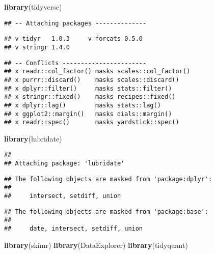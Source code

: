 \documentclass[
]{article}
\newenvironment{Shaded}{\begin{snugshade}}{\end{snugshade}}
\newcommand{\KeywordTok}[1]{\textcolor[rgb]{0.13,0.29,0.53}{\textbf{#1}}}
\newcommand{\NormalTok}[1]{#1}
\begin{document}
\begin{Shaded}
\begin{Highlighting}[]
\KeywordTok{library}\NormalTok{(tidyverse)}
\end{Highlighting}
\end{Shaded}

\begin{verbatim}
## -- Attaching packages --------------
\end{verbatim}

\begin{verbatim}
## v tidyr   1.0.3     v forcats 0.5.0
## v stringr 1.4.0
\end{verbatim}

\begin{verbatim}
## -- Conflicts -----------------------
## x readr::col_factor() masks scales::col_factor()
## x purrr::discard()    masks scales::discard()
## x dplyr::filter()     masks stats::filter()
## x stringr::fixed()    masks recipes::fixed()
## x dplyr::lag()        masks stats::lag()
## x ggplot2::margin()   masks dials::margin()
## x readr::spec()       masks yardstick::spec()
\end{verbatim}

\begin{Shaded}
\begin{Highlighting}[]
\KeywordTok{library}\NormalTok{(lubridate)}
\end{Highlighting}
\end{Shaded}

\begin{verbatim}
## 
## Attaching package: 'lubridate'
\end{verbatim}

\begin{verbatim}
## The following objects are masked from 'package:dplyr':
## 
##     intersect, setdiff, union
\end{verbatim}

\begin{verbatim}
## The following objects are masked from 'package:base':
## 
##     date, intersect, setdiff, union
\end{verbatim}

\begin{Shaded}
\begin{Highlighting}[]
\KeywordTok{library}\NormalTok{(skimr)}
\KeywordTok{library}\NormalTok{(DataExplorer)}
\KeywordTok{library}\NormalTok{(tidyquant)}
\end{Highlighting}
\end{Shaded}
\end{document}
